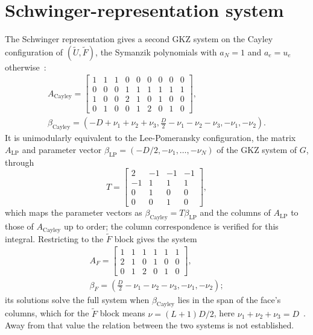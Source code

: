 \documentclass[11pt,a4paper]{article}
\begin{document}
\section{Schwinger-representation system}
The Schwinger representation gives a second GKZ system on the Cayley configuration of $(\tilde U, \tilde F)$, the Symanzik polynomials with $a_N = 1$ and $a_e = u_e$ otherwise~\cite{jimenez2026,klausen2023}:
\begin{gather*}
A_{\text{Cayley}} = \begin{bmatrix}
1 & 1 & 1 & 0 & 0 & 0 & 0 & 0 & 0 \\
0 & 0 & 0 & 1 & 1 & 1 & 1 & 1 & 1 \\
1 & 0 & 0 & 2 & 1 & 0 & 1 & 0 & 0 \\
0 & 1 & 0 & 0 & 1 & 2 & 0 & 1 & 0
\end{bmatrix}, \\
\beta_{\text{Cayley}} = \left(- D + \nu_{1} + \nu_{2} + \nu_{3}, \frac{D}{2} - \nu_{1} - \nu_{2} - \nu_{3}, - \nu_{1}, - \nu_{2}\right).
\end{gather*}
It is unimodularly equivalent to the Lee-Pomeransky configuration, the matrix $A_{\text{LP}}$ and parameter vector $\beta_{\text{LP}} = (-D/2, -\nu_1, \ldots, -\nu_N)$ of the GKZ system of $G$, through
\begin{equation*}
T = \begin{bmatrix}
2 & -1 & -1 & -1 \\
-1 & 1 & 1 & 1 \\
0 & 1 & 0 & 0 \\
0 & 0 & 1 & 0
\end{bmatrix},
\end{equation*}
which maps the parameter vectors as $\beta_{\text{Cayley}} = T \beta_{\text{LP}}$ and the columns of $A_{\text{LP}}$ to those of $A_{\text{Cayley}}$ up to order; the column correspondence is verified for this integral. Restricting to the $\tilde F$ block gives the system
\begin{gather*}
A_F = \begin{bmatrix}
1 & 1 & 1 & 1 & 1 & 1 \\
2 & 1 & 0 & 1 & 0 & 0 \\
0 & 1 & 2 & 0 & 1 & 0
\end{bmatrix}, \\
\beta_F = \left(\frac{D}{2} - \nu_{1} - \nu_{2} - \nu_{3}, - \nu_{1}, - \nu_{2}\right);
\end{gather*}
its solutions solve the full system when $\beta_{\text{Cayley}}$ lies in the span of the face's columns, which for the $\tilde F$ block means $\nu = (L+1)D/2$, here $\nu_{1} + \nu_{2} + \nu_{3} = D$~\cite{britto2026}. Away from that value the relation between the two systems is not established.
\end{document}
